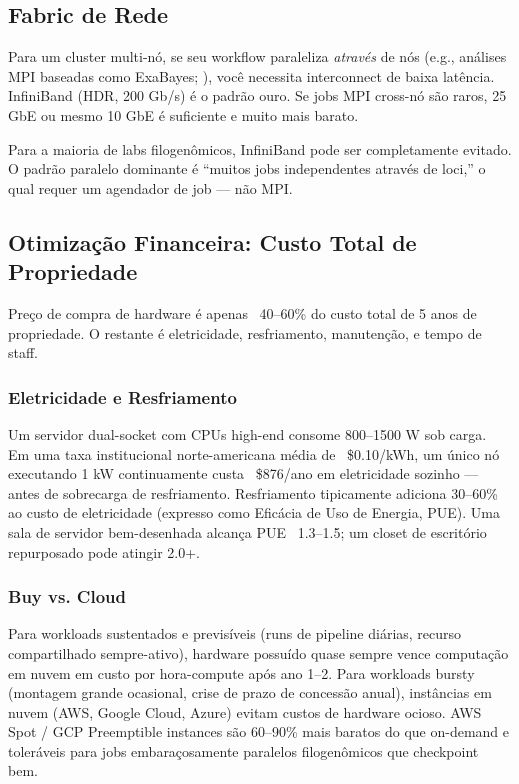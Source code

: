 \subsection{Fabric de Rede}

Para um cluster multi-nó, se seu workflow paraleliza \textit{através} de nós (e.g., análises MPI baseadas como ExaBayes; \textcite{aberer2014}), você necessita interconnect de baixa latência. InfiniBand (HDR, 200 Gb/s) é o padrão ouro. Se jobs MPI cross-nó são raros, 25 GbE ou mesmo 10 GbE é suficiente e muito mais barato.

Para a maioria de labs filogenômicos, InfiniBand pode ser completamente evitado. O padrão paralelo dominante é ``muitos jobs independentes através de loci,'' o qual requer um agendador de job --- não MPI.

\subsection{Otimização Financeira: Custo Total de Propriedade}

Preço de compra de hardware é apenas ~40--60\% do custo total de 5 anos de propriedade. O restante é eletricidade, resfriamento, manutenção, e tempo de staff.

\subsubsection{Eletricidade e Resfriamento}

Um servidor dual-socket com CPUs high-end consome 800--1500 W sob carga. Em uma taxa institucional norte-americana média de ~\$0.10/kWh, um único nó executando 1 kW continuamente custa ~\$876/ano em eletricidade sozinho --- antes de sobrecarga de resfriamento. Resfriamento tipicamente adiciona 30--60\% ao custo de eletricidade (expresso como Eficácia de Uso de Energia, PUE). Uma sala de servidor bem-desenhada alcança PUE ~1.3--1.5; um closet de escritório repurposado pode atingir 2.0+.

\subsubsection{Buy vs. Cloud}

Para workloads sustentados e previsíveis (runs de pipeline diárias, recurso compartilhado sempre-ativo), hardware possuído quase sempre vence computação em nuvem em custo por hora-compute após ano 1--2. Para workloads bursty (montagem grande ocasional, crise de prazo de concessão anual), instâncias em nuvem (AWS, Google Cloud, Azure) evitam custos de hardware ocioso. AWS Spot / GCP Preemptible instances são 60--90\% mais baratos do que on-demand e toleráveis para jobs embaraçosamente paralelos filogenômicos que checkpoint bem.

